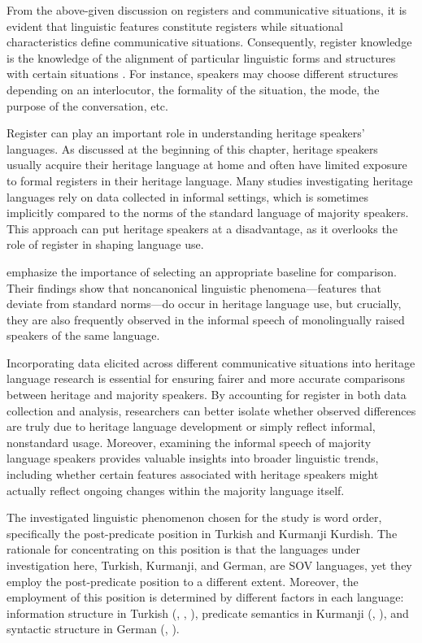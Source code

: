 From the above-given discussion on registers and communicative situations, it is evident that linguistic features constitute registers while situational characteristics define communicative situations. Consequently, register knowledge is the knowledge of the alignment of particular linguistic forms and structures with certain situations \citep{PescumaEtAl2023}. For instance, speakers may choose different structures depending on an interlocutor, the formality of the situation, the mode, the purpose of the conversation, etc.

Register can play an important role in understanding heritage speakers’ languages. As discussed at the beginning of this chapter, heritage speakers usually acquire their heritage language at home and often have limited exposure to formal registers in their heritage language. Many studies investigating heritage languages rely on data collected in informal settings, which is sometimes implicitly compared to the norms of the standard language of majority speakers. This approach can put heritage speakers at a disadvantage, as it overlooks the role of register in shaping language use.

\citet{WieseEtAl2022} emphasize the importance of selecting an appropriate baseline for comparison. Their findings show that noncanonical linguistic phenomena—features that deviate from standard norms—do occur in heritage language use, but crucially, they are also frequently observed in the informal speech of monolingually raised speakers of the same language.

Incorporating data elicited across different communicative situations into heritage language research is essential for ensuring fairer and more accurate comparisons between heritage and majority speakers. By accounting for register in both data collection and analysis, researchers can better isolate whether observed differences are truly due to heritage language development or simply reflect informal, nonstandard usage. Moreover, examining the informal speech of majority language speakers provides valuable insights into broader linguistic trends, including whether certain features associated with heritage speakers might actually reflect ongoing changes within the majority language itself.

The investigated linguistic phenomenon chosen for the study is word order, specifically the post-predicate position in Turkish and Kurmanji Kurdish. The rationale for concentrating on this position is that the languages under investigation here, Turkish, Kurmanji, and German, are SOV languages, yet they employ the post-predicate position to a different extent. Moreover, the employment of this position is determined by different factors in each language: information structure in Turkish (\citealt{Erguvanli1984}, \citealt{Erku1983}, \citealt{Issever2003}), predicate semantics in Kurmanji (\citealt{Gundogdu2019}, \citealt{Haig2018, Haig2020}), and syntactic structure in German (\citealt{Frey2015}, \citealt{Muller2023}).

